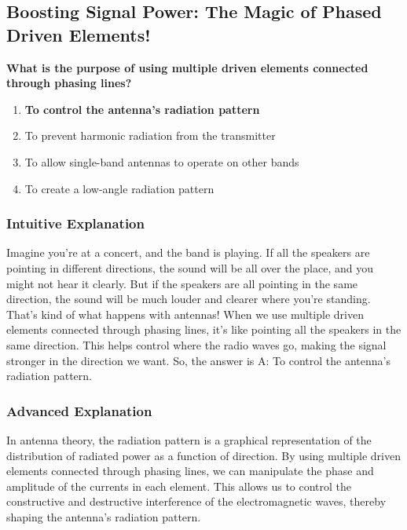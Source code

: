 \subsection{Boosting Signal Power: The Magic of Phased Driven Elements!}
\label{sec:E9E11}

\begin{tcolorbox}[colback=gray!10!white,colframe=black!75!black,title=\textbf{E9E11}]
\textbf{What is the purpose of using multiple driven elements connected through phasing lines?}
\begin{enumerate}[label=\Alph*.]
    \item \textbf{To control the antenna’s radiation pattern}
    \item To prevent harmonic radiation from the transmitter
    \item To allow single-band antennas to operate on other bands
    \item To create a low-angle radiation pattern
\end{enumerate}
\end{tcolorbox}

\subsubsection{Intuitive Explanation}
Imagine you’re at a concert, and the band is playing. If all the speakers are pointing in different directions, the sound will be all over the place, and you might not hear it clearly. But if the speakers are all pointing in the same direction, the sound will be much louder and clearer where you’re standing. That’s kind of what happens with antennas! When we use multiple driven elements connected through phasing lines, it’s like pointing all the speakers in the same direction. This helps control where the radio waves go, making the signal stronger in the direction we want. So, the answer is A: To control the antenna’s radiation pattern.

\subsubsection{Advanced Explanation}
In antenna theory, the radiation pattern is a graphical representation of the distribution of radiated power as a function of direction. By using multiple driven elements connected through phasing lines, we can manipulate the phase and amplitude of the currents in each element. This allows us to control the constructive and destructive interference of the electromagnetic waves, thereby shaping the antenna’s radiation pattern.

